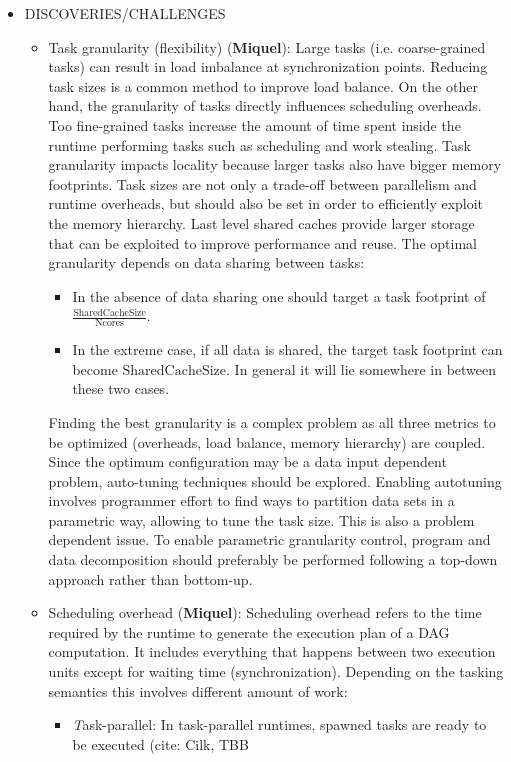 \begin{itemize}
	\item DISCOVERIES/CHALLENGES
	\begin{itemize}
		\item Task granularity (flexibility) (\textbf{Miquel}): 
		Large tasks (i.e. coarse-grained tasks) can result in load imbalance at synchronization points. Reducing task sizes is a common method
		to improve load balance.  On the other hand, the granularity of tasks directly influences scheduling overheads. Too fine-grained tasks
		increase the amount of time spent inside the runtime performing tasks such as scheduling and work stealing.  Task granularity impacts
		locality because larger tasks also have bigger memory footprints. Task sizes are not only a trade-off between parallelism and runtime
		overheads, but should also be set in order to efficiently exploit the memory hierarchy. Last level shared caches provide larger
		storage that can be exploited to improve performance and reuse. The optimal granularity depends on data sharing between tasks:
		\begin{itemize}
			\item In the absence of data sharing one should target a task footprint of $\frac{\mbox{SharedCacheSize}}{\mbox{Ncores}}$. 
			\item In the extreme case, if all data is shared, the target task footprint can become $\mbox{SharedCacheSize}$. In general it
				will lie somewhere in between these two cases.
		\end{itemize} 
		Finding the best granularity is a complex problem as all three metrics to be optimized (overheads, load balance, memory hierarchy) are
		coupled.  Since the optimum configuration may be a data input dependent problem, auto-tuning techniques should be explored.  Enabling
		autotuning involves programmer effort to find ways to partition data sets in a parametric way, allowing to tune the task size. This is
		also a problem dependent issue. To enable parametric granularity control, program and data decomposition should preferably be
		performed following a top-down approach rather than bottom-up.
		\item Scheduling overhead (\textbf{Miquel}):
			Scheduling overhead refers to the time required by the runtime to generate the execution plan of a DAG computation. It
			includes everything that happens between two execution units except for waiting time (synchronization).  Depending on the
			tasking semantics this involves different amount of work:
			\begin{itemize}
				\item  {\emph Task-parallel}: In task-parallel runtimes, spawned tasks are ready to be executed (cite: Cilk, TBB

\end{itemize}
\end{itemize}
\end{itemize}
